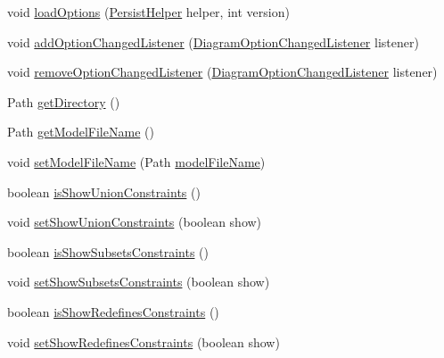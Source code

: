 \begin{DoxyCompactItemize}
void \hyperlink{classorg_1_1tzi_1_1use_1_1gui_1_1views_1_1diagrams_1_1_diagram_options_a1bbfbf90b5da23f5a6cea1976b890c8d}{load\-Options} (\hyperlink{classorg_1_1tzi_1_1use_1_1gui_1_1util_1_1_persist_helper}{Persist\-Helper} helper, int version)
\item 
void \hyperlink{classorg_1_1tzi_1_1use_1_1gui_1_1views_1_1diagrams_1_1_diagram_options_abc8b453d4ba1dbf4a5d389deebc8a071}{add\-Option\-Changed\-Listener} (\hyperlink{interfaceorg_1_1tzi_1_1use_1_1gui_1_1views_1_1diagrams_1_1_diagram_option_changed_listener}{Diagram\-Option\-Changed\-Listener} listener)
\item 
void \hyperlink{classorg_1_1tzi_1_1use_1_1gui_1_1views_1_1diagrams_1_1_diagram_options_a8a587d97a9052c62332f124568fe65b6}{remove\-Option\-Changed\-Listener} (\hyperlink{interfaceorg_1_1tzi_1_1use_1_1gui_1_1views_1_1diagrams_1_1_diagram_option_changed_listener}{Diagram\-Option\-Changed\-Listener} listener)
\item 
Path \hyperlink{classorg_1_1tzi_1_1use_1_1gui_1_1views_1_1diagrams_1_1_diagram_options_a8e027a8e8ac051b60f5c190d337721e1}{get\-Directory} ()
\item 
Path \hyperlink{classorg_1_1tzi_1_1use_1_1gui_1_1views_1_1diagrams_1_1_diagram_options_a96d50cd10e923ea39bd2dda1aa8e3b26}{get\-Model\-File\-Name} ()
\item 
void \hyperlink{classorg_1_1tzi_1_1use_1_1gui_1_1views_1_1diagrams_1_1_diagram_options_a910cb5fb14b799156f6e5b8ba059c79d}{set\-Model\-File\-Name} (Path \hyperlink{classorg_1_1tzi_1_1use_1_1gui_1_1views_1_1diagrams_1_1_diagram_options_a2a82d18574d669501f037d6783495aec}{model\-File\-Name})
\item 
boolean \hyperlink{classorg_1_1tzi_1_1use_1_1gui_1_1views_1_1diagrams_1_1_diagram_options_acf579f420cd78ef3e0add198276a5765}{is\-Show\-Union\-Constraints} ()
\item 
void \hyperlink{classorg_1_1tzi_1_1use_1_1gui_1_1views_1_1diagrams_1_1_diagram_options_a8c1c7f83d7a9c167e04ac632557bef9a}{set\-Show\-Union\-Constraints} (boolean show)
\item 
boolean \hyperlink{classorg_1_1tzi_1_1use_1_1gui_1_1views_1_1diagrams_1_1_diagram_options_a29b570e56b4d755bf317c50393302756}{is\-Show\-Subsets\-Constraints} ()
\item 
void \hyperlink{classorg_1_1tzi_1_1use_1_1gui_1_1views_1_1diagrams_1_1_diagram_options_a88cce18d9fa02401683c721bac9647e2}{set\-Show\-Subsets\-Constraints} (boolean show)
\item 
boolean \hyperlink{classorg_1_1tzi_1_1use_1_1gui_1_1views_1_1diagrams_1_1_diagram_options_a2250081205ed5b5e9b83fc615c588c60}{is\-Show\-Redefines\-Constraints} ()
\item 
void \hyperlink{classorg_1_1tzi_1_1use_1_1gui_1_1views_1_1diagrams_1_1_diagram_options_abbfb832fbe71e06fa1b12a211781e3b9}{set\-Show\-Redefines\-Constraints} (boolean show)
\end{DoxyCompactItemize}
